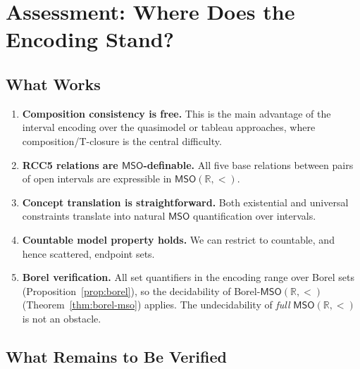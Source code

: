 \documentclass[a4paper,11pt]{article}
\theoremstyle{definition}
\newcommand{\MSO}{\ensuremath{\mathsf{MSO}}}
\newcommand{\reals}{\ensuremath{\mathbb{R}}}
\begin{document}
\section{Assessment: Where Does the Encoding Stand?}
\label{sec:assessment}

\subsection{What Works}
\begin{enumerate}[nosep]
  \item \textbf{Composition consistency is free.}\;  This is the main
    advantage of the interval encoding over the quasimodel or tableau
    approaches, where composition/T-closure is the central difficulty.
  \item \textbf{RCC5 relations are $\MSO$-definable.}\;  All five
    base relations between pairs of open intervals are expressible
    in $\MSO(\reals, <)$.
  \item \textbf{Concept translation is straightforward.}\;
    Both existential and universal constraints translate into
    natural $\MSO$ quantification over intervals.
  \item \textbf{Countable model property holds.}\;  We can restrict to
    countable, and hence scattered, endpoint sets.
  \item \textbf{Borel verification.}\;  All set quantifiers in the
    encoding range over Borel sets (Proposition~\ref{prop:borel}),
    so the decidability of Borel-$\MSO(\reals, <)$
    (Theorem~\ref{thm:borel-mso}) applies.  The undecidability of
    \emph{full} $\MSO(\reals, <)$ is not an obstacle.
\end{enumerate}

\subsection{What Remains to Be Verified}
\end{document}
